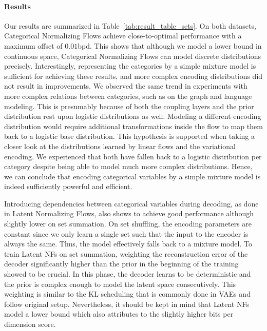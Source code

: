 \paragraph{Results} Our results are summarized in Table~\ref{tab:result_table_sets}. 
On both datasets, Categorical Normalizing Flows achieve close-to-optimal performance with a maximum offset of $0.01$bpd. 
This shows that although we model a lower bound in continuous space, Categorical Normalizing Flows can model discrete distributions precisely. 
Interestingly, representing the categories by a simple mixture model is sufficient for achieving these results, and more complex encoding distributions did not result in improvements. 
We observed the same trend in experiments with more complex relations between categories, such as on the graph and language modeling. 
This is presumably because of both the coupling layers and the prior distribution rest upon logistic distributions as well.
Modeling a different encoding distribution would require additional transformations inside the flow to map them back to a logistic base distribution.
This hypothesis is supported when taking a closer look at the distributions learned by linear flows and the variational encoding.
We experienced that both have fallen back to a logistic distribution per category despite being able to model much more complex distributions.
Hence, we can conclude that encoding categorical variables by a simple mixture model is indeed sufficiently powerful and efficient.

Introducing dependencies between categorical variables during decoding, as done in Latent Normalizing Flows, also shows to achieve good performance although slightly lower on set summation.
On set shuffling, the encoding parameters are constant since we only learn a single set such that the input to the encoder is always the same. 
Thus, the model effectively falls back to a mixture model.
To train Latent NFs on set summation, weighting the reconstruction error of the decoder significantly higher than the prior in the beginning of the training showed to be crucial.
In this phase, the decoder learns to be deterministic and the prior is complex enough to model the latent space consecutively.
This weighting is similar to the KL scheduling that is commonly done in VAEs and follow \citet{SemiDiscreteNFSequence} original setup.
Nevertheless, it should be kept in mind that Latent NFs model a lower bound which also attributes to the slightly higher bits per dimension score.

